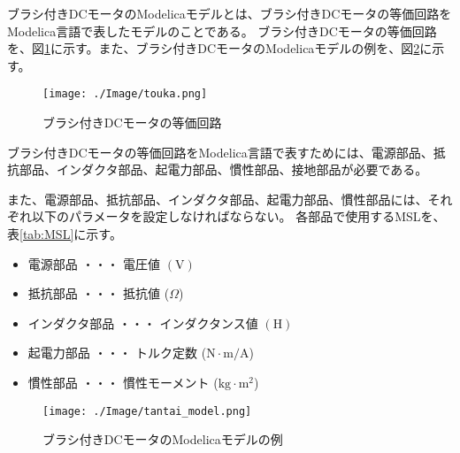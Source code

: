 ブラシ付きDCモータのModelicaモデルとは、ブラシ付きDCモータの等価回路\cite{等価回路}をModelica言語で表したモデルのことである。
ブラシ付きDCモータの等価回路を、図\ref{fig:touka}に示す。また、ブラシ付きDCモータのModelicaモデルの例を、図\ref{fig:tantai_model}に示す。
\begin{figure}[t]
	\centering
	\texttt{[image: ./Image/touka.png]}
	\caption{ブラシ付きDCモータの等価回路}
	\label{fig:touka}
  \end{figure}
ブラシ付きDCモータの等価回路をModelica言語で表すためには、電源部品、抵抗部品、インダクタ部品、起電力部品、慣性部品、接地部品が必要である。

また、電源部品、抵抗部品、インダクタ部品、起電力部品、慣性部品には、それぞれ以下のパラメータを設定しなければならない。
各部品で使用するMSLを、表\ref{tab:MSL}に示す。
\begin{itemize}
	\item 電源部品 ・・・ 電圧値 $(\mathrm{V})$
	\item 抵抗部品 ・・・ 抵抗値 ($\Omega$)
	\item インダクタ部品 ・・・ インダクタンス値 $(\mathrm{H})$
	\item 起電力部品 ・・・ トルク定数 ($\mathrm{N\cdot m/A}$)
	\item 慣性部品 ・・・ 慣性モーメント ($\mathrm{kg\cdot m^2}$)
\end{itemize}

\begin{figure}[t]
	\centering
	\texttt{[image: ./Image/tantai\_model.png]}
	\caption{ブラシ付きDCモータのModelicaモデルの例}
	\label{fig:tantai_model}
  \end{figure}
  

